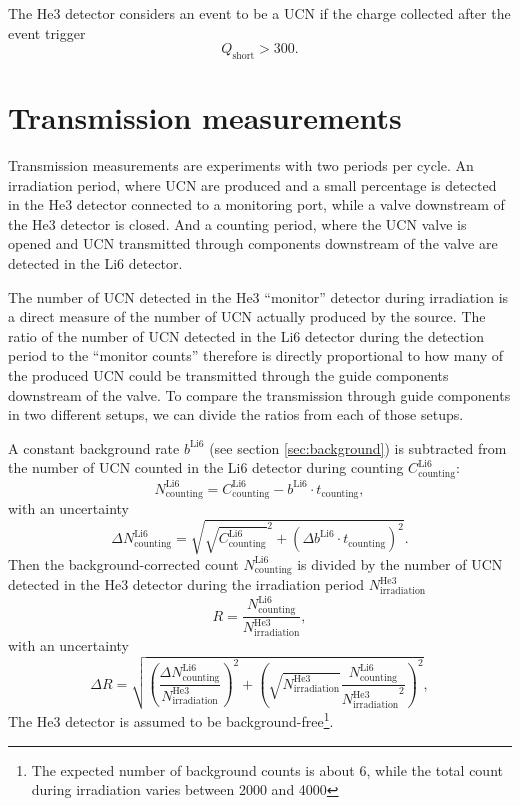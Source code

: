 \documentclass[10pt,letterpaper]{article}
\begin{document}
The He3 detector considers an event to be a UCN if the charge collected after the event trigger
\begin{equation}
Q_\mathrm{short} > 300.
\end{equation}

\section{Transmission measurements}

Transmission measurements are experiments with two periods per cycle. An irradiation period, where UCN are produced and a small percentage is detected in the He3 detector connected to a monitoring port, while a valve downstream of the He3 detector is closed. And a counting period, where the UCN valve is opened and UCN transmitted through components downstream of the valve are detected in the Li6 detector.

The number of UCN detected in the He3 ``monitor'' detector during irradiation is a direct measure of the number of UCN actually produced by the source. The ratio of the number of UCN detected in the Li6 detector during the detection period to the ``monitor counts'' therefore is directly proportional to how many of the produced UCN could be transmitted through the guide components downstream of the valve. To compare the transmission through guide components in two different setups, we can divide the ratios from each of those setups.

A constant background rate $b^\mathrm{Li6}$ (see section \ref{sec:background}) is subtracted from the number of UCN counted in the Li6 detector during counting $C^\mathrm{Li6}_\mathrm{counting}$:
\begin{equation}
N^\mathrm{Li6}_\mathrm{counting} = C^\mathrm{Li6}_\mathrm{counting} - b^\mathrm{Li6} \cdot t_\mathrm{counting},
\end{equation}
with an uncertainty
\begin{equation}
\Delta N^\mathrm{Li6}_\mathrm{counting} = \sqrt{ \sqrt{C^\mathrm{Li6}_\mathrm{counting}}^2 + \left( \Delta b^\mathrm{Li6} \cdot t_\mathrm{counting} \right)^2}.
\end{equation}
Then the background-corrected count $N^\mathrm{Li6}_\mathrm{counting}$ is divided by the number of UCN detected in the He3 detector during the irradiation period $N^\mathrm{He3}_\mathrm{irradiation}$
\begin{equation}
R = \frac{N^\mathrm{Li6}_\mathrm{counting}}{N^\mathrm{He3}_\mathrm{irradiation}},
\end{equation}
with an uncertainty
\begin{equation}
\Delta R = \sqrt{ \left( \frac{\Delta N^\mathrm{Li6}_\mathrm{counting}}{N^\mathrm{He3}_\mathrm{irradiation}} \right)^2 + \left( \sqrt{N^\mathrm{He3}_\mathrm{irradiation}} \frac{N^\mathrm{Li6}_\mathrm{counting}}{{N^\mathrm{He3}_\mathrm{irradiation}}^2} \right)^2  },
\end{equation}
The He3 detector is assumed to be background-free\footnote{The expected number of background counts is about 6, while the total count during irradiation varies between 2000 and 4000}.
\end{document}
